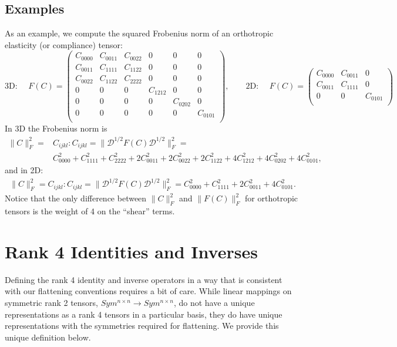 \documentclass[10pt]{article}
\providecommand{\norm}[1]{\lVert#1\rVert}
\begin{document}
\subsection{Examples}
As an example, we compute the squared Frobenius norm of an orthotropic
elasticity (or compliance) tensor:
$$
\text{3D: } \quad F(C) = \begin{pmatrix}
    C_{0000} & C_{0011} & C_{0022} & 0 & 0 & 0 \\
    C_{0011} & C_{1111} & C_{1122} & 0 & 0 & 0 \\
    C_{0022} & C_{1122} & C_{2222} & 0 & 0 & 0 \\
           0 &        0 &        0 & C_{1212} & 0 & 0 \\
           0 &        0 &        0 & 0 & C_{0202} & 0 \\
           0 &        0 &        0 & 0 & 0 & C_{0101} \\
\end{pmatrix}, \quad \quad
\text{2D: } \quad F(C) = \begin{pmatrix}
    C_{0000} & C_{0011} & 0 \\
    C_{0011} & C_{1111} & 0 \\
           0 &        0 & C_{0101} \\
\end{pmatrix}
$$
In 3D the Frobenius norm is
\begin{align*}
    \norm{C}^2_F = &C_{ijkl} : C_{ijkl} = \norm{\mathscr{D}^{1/2} F(C) \mathscr{D}^{1/2}}^2_F = \\
&C_{0000}^2 + C_{1111}^2 + C_{2222}^2 + 2 C_{0011}^2 + 2 C_{0022}^2 + 2 C_{1122}^2
+ 4 C_{1212}^2 + 4 C_{0202}^2 + 4 C_{0101}^2,
\end{align*}
and in 2D:
\begin{align*}
    \norm{C}^2_F = C_{ijkl} : C_{ijkl} = \norm{\mathscr{D}^{1/2} F(C) \mathscr{D}^{1/2}}^2_F = C_{0000}^2 + C_{1111}^2 + 2 C_{0011}^2 + 4 C_{0101}^2.
\end{align*}
Notice that the only difference between $\norm{C}_F^2$ and $\norm{F(C)}_F^2$
for orthotropic tensors is the weight of 4 on the ``shear'' terms.

\section{Rank 4 Identities and Inverses}
Defining the rank 4 identity and inverse operators in a way that is consistent
with our flattening conventions requires a bit of care. While linear mappings
on symmetric rank 2 tensors, $Sym^{n\times n} \to Sym^{n\times n}$, do not have
a unique representations as a rank 4 tensors in a particular basis, they do
have unique representations with the symmetries required for flattening. We
provide this unique definition below.
\end{document}
